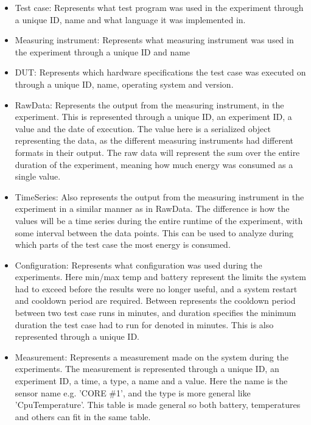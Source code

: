 \begin{itemize}
    \item Test case: Represents what test program was used in the experiment through a unique ID, name and what language it was implemented in.
    \item Measuring instrument: Represents what measuring instrument was used in the experiment through a unique ID and name
    \item DUT: Represents which hardware specifications the test case was executed on through a unique ID, name, operating system and version. 
    \item RawData: Represents the output from the measuring instrument, in the experiment. This is represented through a unique ID, an experiment ID, a value and the date of execution. The value here is a serialized object representing the data, as the different measuring instruments had different formats in their output. The raw data will represent the sum over the entire duration of the experiment, meaning how much energy was consumed as a single value.
    \item TimeSeries: Also represents the output from the measuring instrument in the experiment in a similar manner as in RawData. The difference is how the values will be a time series during the entire runtime of the experiment, with some interval between the data points. This can be used to analyze during which parts of the test case the most energy is consumed.
    \item Configuration: Represents what configuration was used during the experiments. Here min/max temp and battery represent the limits the system had to exceed before the results were no longer useful, and a system restart and cooldown period are required. Between represents the cooldown period between two test case runs in minutes, and duration specifies the minimum duration the test case had to run for denoted in minutes. This is also represented through a unique ID.
    \item Measurement: Represents a measurement made on the system during the experiments. The measurement is represented through a unique ID, an experiment ID, a time, a type, a name and a value. Here the name is the sensor name e.g. 'CORE \#1', and the type is more general like 'CpuTemperature'. This table is made general so both battery, temperatures and others can fit in the same table.

\end{itemize}
